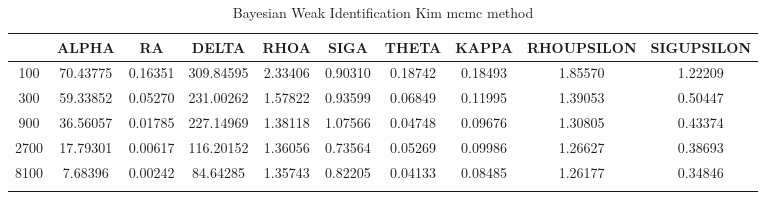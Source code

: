\documentclass[a4paper,10pt]{article}
\begin{document}
\centering
\begin{longtable}{cccccccccc}
\toprule
 & ALPHA & RA & DELTA & RHOA & SIGA & THETA & KAPPA & RHOUPSILON & SIGUPSILON \\
\midrule
100 & 70.43775 & 0.16351 & 309.84595 & 2.33406 & 0.90310 & 0.18742 & 0.18493 & 1.85570 & 1.22209 \\
300 & 59.33852 & 0.05270 & 231.00262 & 1.57822 & 0.93599 & 0.06849 & 0.11995 & 1.39053 & 0.50447 \\
900 & 36.56057 & 0.01785 & 227.14969 & 1.38118 & 1.07566 & 0.04748 & 0.09676 & 1.30805 & 0.43374 \\
2700 & 17.79301 & 0.00617 & 116.20152 & 1.36056 & 0.73564 & 0.05269 & 0.09986 & 1.26627 & 0.38693 \\
8100 & 7.68396 & 0.00242 & 84.64285 & 1.35743 & 0.82205 & 0.04133 & 0.08485 & 1.26177 & 0.34846 \\
\bottomrule
\caption{Bayesian Weak Identification Kim mcmc method}
\label{table:tbl:WeakKim_mcmc}
\end{longtable}
\end{document}
